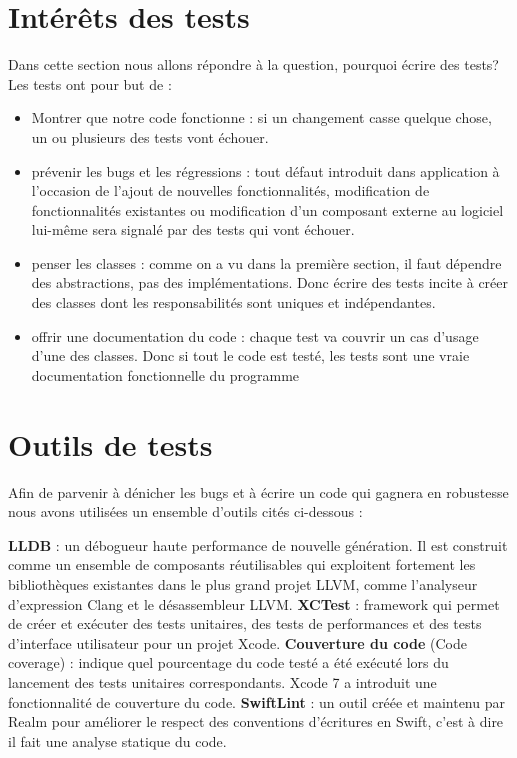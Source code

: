 \section{Intérêts des tests} %
\label{sub:pourquoi_tester_}
Dans cette section nous allons répondre à la question, pourquoi écrire des tests?\newline
Les tests ont pour but de :
\begin{itemize}
	\item Montrer que notre code fonctionne :  si un changement casse quelque chose, un ou plusieurs des tests vont échouer.
	\item prévenir les bugs et les régressions : tout défaut introduit dans application à l'occasion de l'ajout de nouvelles fonctionnalités, modification de fonctionnalités existantes ou modification d'un composant externe au logiciel lui-même sera signalé par des tests qui vont échouer.
	\item penser les classes : comme on a vu dans la première section, il faut dépendre des abstractions, pas des implémentations. Donc écrire des tests incite à créer des classes dont les responsabilités sont uniques et indépendantes.
	\item offrir une documentation du code : chaque test va couvrir un cas d'usage d'une des classes. Donc si tout le code est testé, les tests sont une vraie documentation fonctionnelle du programme
\end{itemize} 

\section{Outils de tests} %
\label{sub:outils_de_tests}
Afin de parvenir à dénicher les bugs et à écrire un code qui gagnera en robustesse nous avons utilisées un ensemble d'outils cités ci-dessous : 
\begin{itemize}
	\itemb \textbf{LLDB} : un débogueur haute performance de nouvelle génération. Il est construit comme un ensemble de composants réutilisables qui exploitent fortement les bibliothèques existantes dans le plus grand projet LLVM, comme l'analyseur d'expression Clang et le désassembleur LLVM.
	\itemb \textbf{XCTest} : framework qui permet de créer et exécuter des tests unitaires, des tests de performances et des tests d'interface utilisateur pour un projet Xcode.
	\itemb \textbf{Couverture du code} (Code coverage) : indique quel pourcentage du code testé a été exécuté lors du lancement des tests unitaires correspondants. Xcode 7 a introduit une fonctionnalité de couverture du code.
	\itemb \textbf{SwiftLint} : un outil créée et maintenu par Realm pour améliorer le respect des conventions d’écritures en Swift, c'est à dire il fait une analyse statique du code.
\end{itemize}

